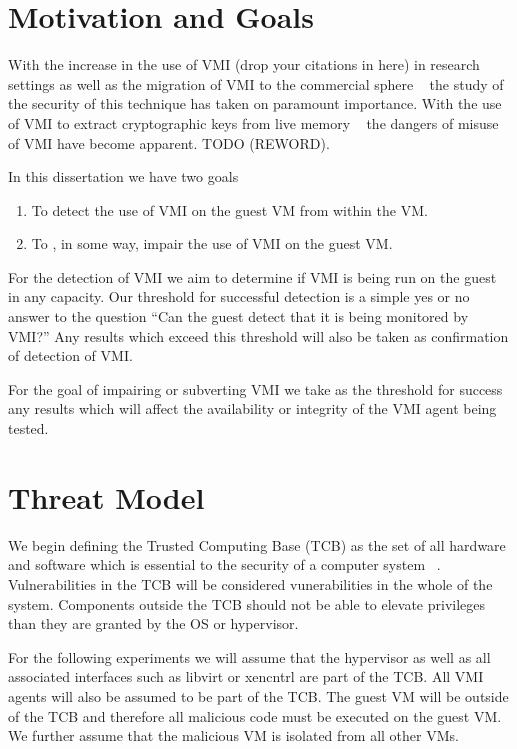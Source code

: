 
\section{Motivation and Goals}

	With the increase in the use of VMI (drop your citations in here) in research settings as well as the migration of VMI to the commercial sphere ~\cite{_vmware_2014} the study of the security of this technique has taken on paramount importance. With the use of VMI to extract cryptographic keys from live memory ~\cite{hay_circumventing_2012} the dangers of misuse of VMI have become apparent. TODO (REWORD). 

	In this dissertation we have two goals

	\begin{enumerate}
	\item To detect the use of VMI on the guest VM from within the VM. 
	\item To , in some way, impair the use of VMI on the guest VM. 
	\end{enumerate} 

	For the detection of VMI we aim to determine if VMI is being run on the guest in any capacity. Our threshold for successful detection is a simple yes or no answer to the question “Can the guest detect that it is being monitored by VMI?” Any results which exceed this threshold will also be taken as confirmation of detection of VMI.

For the goal of impairing or subverting VMI we take as the threshold for success any  results which will affect the availability or integrity of the VMI agent being tested. 


\section{Threat Model}
	We begin defining the Trusted Computing Base (TCB) as the set of all hardware and software which is essential to the security of a computer system ~\cite{rushby_critical_1994}. Vulnerabilities in the TCB will be considered vunerabilities in the whole of the system. Components outside the TCB should not be able to elevate privileges than they are granted by the OS or hypervisor. 

	For the following experiments we will assume that the hypervisor as well as all associated interfaces such as libvirt or xencntrl are part of the TCB. All VMI agents will also be assumed to be part of the TCB. The guest VM will be outside of the TCB and therefore all malicious code must be executed on the guest VM. We further assume that the malicious VM is isolated from all other VMs. 

